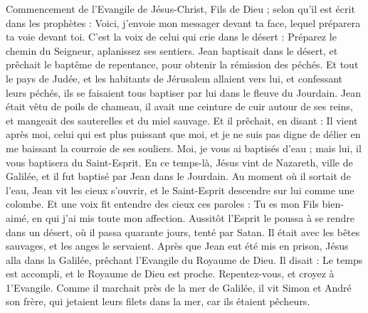 \BFont
\begin{multicols}{2}
\VerseOne{}Commencement de l'Evangile de Jésus-Christ, Fils de Dieu ;
selon qu'il est écrit dans les prophètes : Voici, j'envoie mon messager devant ta face, lequel préparera ta voie devant toi.
C’est la voix de celui qui crie dans le désert : Préparez le chemin du Seigneur, aplanissez ses sentiers{}.
Jean baptisait dans le désert, et prêchait le baptême de repentance, pour obtenir la rémission des péchés.
Et tout le pays de Judée, et les habitants de Jérusalem allaient vers lui, et confessant leurs péchés, ils se faisaient tous baptiser par lui dans le fleuve du Jourdain.
Jean était vêtu de poils de chameau, il avait une ceinture de cuir autour de ses reins, et mangeait des sauterelles et du miel sauvage.
Et il prêchait, en disant : Il vient après moi, celui qui est plus puissant que moi, et je ne suis pas digne de délier en me baissant la courroie de ses souliers.
Moi, je vous ai baptisés d'eau ; mais lui, il vous baptisera du Saint-Esprit.
En ce temps-là, Jésus vint de Nazareth, ville de Galilée, et il fut baptisé par Jean dans le Jourdain.
Au moment où il sortait de l'eau, Jean vit les cieux s’ouvrir, et le Saint-Esprit descendre sur lui comme une colombe.
Et une voix fit entendre des cieux ces paroles : Tu es mon Fils bien-aimé, en qui j'ai mis toute mon affection.
Aussitôt l'Esprit le poussa à se rendre dans un désert,
où il passa quarante jours, tenté par Satan. Il était avec les bêtes sauvages, et les anges le servaient.
Après que Jean eut été mis en prison, Jésus alla dans la Galilée, prêchant l'Evangile du Royaume de Dieu.
Il disait : Le temps est accompli, et le Royaume de Dieu est proche. Repentez-vous, et croyez à 1'Evangile.
Comme il marchait près de la mer de Galilée, il vit Simon et André son frère, qui jetaient leurs filets dans la mer, car ils étaient pêcheurs.

\end{multicols}
